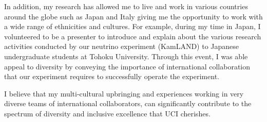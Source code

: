 \documentclass[10pt]{article} %
\begin{document}
In addition, my research has allowed me to live and work in various countries
around the globe such as Japan and Italy giving me the opportunity to work with
a wide range of ethnicities and cultures. For example, during my time in Japan,
I volunteered to be a presenter to introduce and explain about the various
research activities conducted by our neutrino experiment (KamLAND) to Japanese
undergraduate students at Tohoku University. Through this event, I was able
appeal to diversity by conveying the importance of international collaboration
that our experiment requires to successfully operate the experiment.

I believe that my multi-cultural upbringing and experiences working in very
diverse teams of international collaborators, can significantly contribute to
the spectrum of diversity and inclusive excellence that UCI cherishes.

\end{document}

